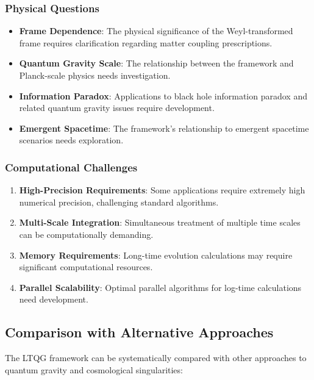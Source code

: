 \subsubsection{Physical Questions}

\begin{itemize}
\item \textbf{Frame Dependence}: The physical significance of the Weyl-transformed frame requires clarification regarding matter coupling prescriptions.

\item \textbf{Quantum Gravity Scale}: The relationship between the framework and Planck-scale physics needs investigation.

\item \textbf{Information Paradox}: Applications to black hole information paradox and related quantum gravity issues require development.

\item \textbf{Emergent Spacetime}: The framework's relationship to emergent spacetime scenarios needs exploration.
\end{itemize}

\subsubsection{Computational Challenges}

\begin{enumerate}
\item \textbf{High-Precision Requirements}: Some applications require extremely high numerical precision, challenging standard algorithms.
\item \textbf{Multi-Scale Integration}: Simultaneous treatment of multiple time scales can be computationally demanding.
\item \textbf{Memory Requirements}: Long-time evolution calculations may require significant computational resources.
\item \textbf{Parallel Scalability}: Optimal parallel algorithms for log-time calculations need development.
\end{enumerate}

\subsection{Comparison with Alternative Approaches}
\label{subsec:alternative_comparison}

The LTQG framework can be systematically compared with other approaches to quantum gravity and cosmological singularities:

